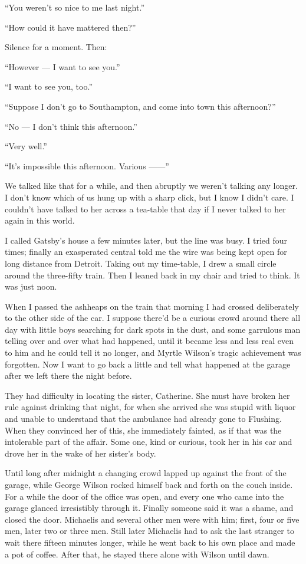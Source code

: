 \documentclass{znotebook}
\begin{document}
``You weren’t so nice to me last night.''

``How could it have mattered then?''

Silence for a moment. Then:

``However — I want to see you.''

``I want to see you, too.''

``Suppose I don’t go to Southampton, and come into town this afternoon?''

``No — I don’t think this afternoon.''

``Very well.''

``It’s impossible this afternoon. Various ——''

We talked like that for a while, and then abruptly we weren’t talking any longer. I don’t know which of us hung up with a sharp click, but I know I didn’t care. I couldn’t have talked to her across a tea-table that day if I never talked to her again in this world.

I called Gatsby’s house a few minutes later, but the line was busy. I tried four times; finally an exasperated central told me the wire was being kept open for long distance from Detroit. Taking out my time-table, I drew a small circle around the three-fifty train. Then I leaned back in my chair and tried to think. It was just noon.

When I passed the ashheaps on the train that morning I had crossed deliberately to the other side of the car. I suppose there’d be a curious crowd around there all day with little boys searching for dark spots in the dust, and some garrulous man telling over and over what had happened, until it became less and less real even to him and he could tell it no longer, and Myrtle Wilson’s tragic achievement was forgotten. Now I want to go back a little and tell what happened at the garage after we left there the night before.

They had difficulty in locating the sister, Catherine. She must have broken her rule against drinking that night, for when she arrived she was stupid with liquor and unable to understand that the ambulance had already gone to Flushing. When they convinced her of this, she immediately fainted, as if that was the intolerable part of the affair. Some one, kind or curious, took her in his car and drove her in the wake of her sister’s body.

Until long after midnight a changing crowd lapped up against the front of the garage, while George Wilson rocked himself back and forth on the couch inside. For a while the door of the office was open, and every one who came into the garage glanced irresistibly through it. Finally someone said it was a shame, and closed the door. Michaelis and several other men were with him; first, four or five men, later two or three men. Still later Michaelis had to ask the last stranger to wait there fifteen minutes longer, while he went back to his own place and made a pot of coffee. After that, he stayed there alone with Wilson until dawn.
\end{document}
